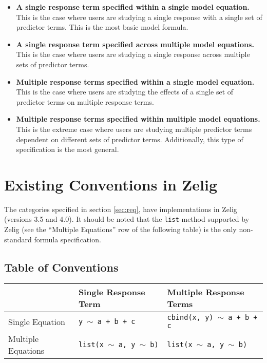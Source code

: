 \documentclass{article}
\newcommand{\tweedly}[0]{$\sim${ }}
\begin{document}
\begin{itemize}

  \item {\bf A single response term specified within a single model equation.}
    This is the case where users are studying a single response with a single
    set of predictor terms. This is the most basic model formula.

  \item {\bf A single response term specified across multiple model equations.}
    This is the case where users are studying a single response across multiple
    sets of predictor terms.

  \item {\bf Multiple response terms specified within a single model equation.}
    This is the case where users are studying the effects of a single set of
    predictor terms on multiple response terms.

  \item {\bf Multiple response terms specified within multiple model equations.}
    This is the extreme case where users are studying multiple predictor terms
    dependent on different sets of predictor terms. Additionally, this type of
    specification is the most general.

\end{itemize}



%
%
%
\section{Existing Conventions in Zelig}
\label{sec:existing-zelig}

The categories specified in section \ref{sec:req}, have implementations in
Zelig (versions 3.5 and 4.0). It should be noted that the {\tt list}-method
supported by Zelig (see the ``Multiple Equations'' row of the following table)
is the only non-standard formula specification.


\subsection{Table of Conventions}
\label{subsec:table-conventions}

{\noindent}\begin{tabular}{|l|l|l|}

  \hline

  & Single Response Term & Multiple Response Terms \\ \hline

  Single Equation &
  {\tt y \tweedly a + b + c} & {\tt cbind(x, y) \tweedly a + b + c}
  \\ \hline

  Multiple Equations & 
  {\tt list(x \tweedly a, y \tweedly b)} &
  {\tt list(x \tweedly a, y \tweedly b)} \\ \hline


\end{tabular}
\end{document}
